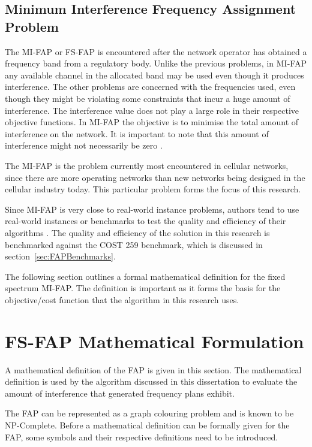 \subsection{Minimum Interference Frequency Assignment Problem}
The \gls{MI-FAP} or \gls{FS-FAP} is encountered after the network operator has obtained a frequency band from a regulatory body\cite{Karen2004}.
Unlike the previous problems, in \gls{MI-FAP} any available channel in the allocated band may be used even though it produces interference. The other problems are concerned with the frequencies used, even though they might be violating some constraints that incur a huge amount of interference\cite{MontemanniThesis,MultipleBinaryFAP}. The interference value does not play a large role in their respective objective functions\cite{Eisenblatter,MultipleBinaryFAP}. In \gls{MI-FAP} the objective is to minimise the total amount of interference on the network. It is important to note that this amount of interference might not necessarily be zero \cite{Karen2004,Eisenblatter}.

The \gls{MI-FAP} is the problem currently most encountered in cellular networks, since there are more operating networks than new networks being designed in the cellular industry today\cite{Karen2004}. This particular problem forms the focus of this research. 

Since \gls{MI-FAP} is very close to real-world instance problems, authors tend to use real-world instances or benchmarks to test the quality and efficiency of their algorithms \cite{Eisenblatter,MontemanniThesis}. The quality and efficiency of the solution in this research is benchmarked against the \gls{COST} 259 benchmark, which is discussed in section~\ref{sec:FAPBenchmarks}.

The following section outlines a formal mathematical definition for the fixed spectrum \gls{MI-FAP}. The definition is important as it forms the basis for the objective/cost function that the algorithm in this research uses.
 
\section{FS-FAP Mathematical Formulation}
\label{sec:FAPMathDef}
A mathematical definition of the \gls{FAP} is given in this section. The mathematical definition is used by the algorithm discussed in this dissertation to evaluate the amount of interference that generated frequency plans exhibit.

The \gls{FAP} can be represented as a graph colouring problem and is known to be NP-Complete. Before a mathematical definition can be formally given for the \gls{FAP}, some symbols and their respective definitions need to be introduced.


